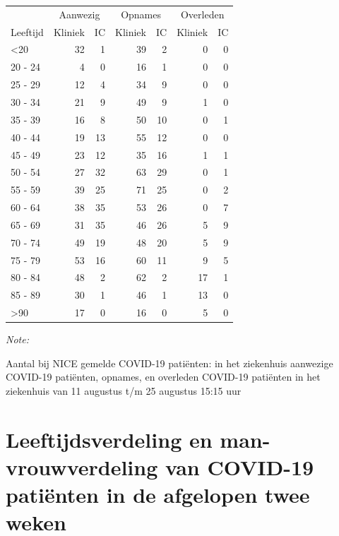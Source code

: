\documentclass[
  english,
  man,floatsintext]{apa6}
\begin{document}
\begin{table}
\centering\begingroup\fontsize{10}{12}\selectfont

\begin{threeparttable}
\begin{tabular}{lrrrrrr}
\toprule
\multicolumn{1}{c}{ } & \multicolumn{2}{c}{Aanwezig} & \multicolumn{2}{c}{Opnames} & \multicolumn{2}{c}{Overleden} \\
\cmidrule(l{3pt}r{3pt}){2-3} \cmidrule(l{3pt}r{3pt}){4-5} \cmidrule(l{3pt}r{3pt}){6-7}
Leeftijd & Kliniek & IC & Kliniek & IC & Kliniek & IC\\
\midrule
<20 & 32 & 1 & 39 & 2 & 0 & 0\\
20 - 24 & 4 & 0 & 16 & 1 & 0 & 0\\
25 - 29 & 12 & 4 & 34 & 9 & 0 & 0\\
30 - 34 & 21 & 9 & 49 & 9 & 1 & 0\\
35 - 39 & 16 & 8 & 50 & 10 & 0 & 1\\
40 - 44 & 19 & 13 & 55 & 12 & 0 & 0\\
45 - 49 & 23 & 12 & 35 & 16 & 1 & 1\\
50 - 54 & 27 & 32 & 63 & 29 & 0 & 1\\
55 - 59 & 39 & 25 & 71 & 25 & 0 & 2\\
60 - 64 & 38 & 35 & 53 & 26 & 0 & 7\\
65 - 69 & 31 & 35 & 46 & 26 & 5 & 9\\
70 - 74 & 49 & 19 & 48 & 20 & 5 & 9\\
75 - 79 & 53 & 16 & 60 & 11 & 9 & 5\\
80 - 84 & 48 & 2 & 62 & 2 & 17 & 1\\
85 - 89 & 30 & 1 & 46 & 1 & 13 & 0\\
>90 & 17 & 0 & 16 & 0 & 5 & 0\\
\bottomrule
\end{tabular}
\begin{tablenotes}
\item \textit{Note: } 
\item Aantal bij NICE gemelde COVID-19 patiënten: in het ziekenhuis aanwezige COVID-19 patiënten, opnames, en overleden COVID-19 patiënten in het ziekenhuis van 11 augustus t/m 25 augustus 15:15 uur
\end{tablenotes}
\end{threeparttable}
\endgroup{}
\end{table}

\newpage

\hypertarget{leeftijdsverdeling-en-man-vrouwverdeling-van-covid-19-patiuxebnten-in-de-afgelopen-twee-weken}{%
\section{Leeftijdsverdeling en man-vrouwverdeling van COVID-19 patiënten in de afgelopen twee weken}\label{leeftijdsverdeling-en-man-vrouwverdeling-van-covid-19-patiuxebnten-in-de-afgelopen-twee-weken}}
\end{document}

